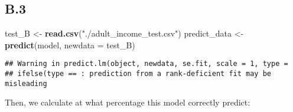 \documentclass[]{article}
\newenvironment{Shaded}{\begin{snugshade}}{\end{snugshade}}
\newcommand{\KeywordTok}[1]{\textcolor[rgb]{0.13,0.29,0.53}{\textbf{#1}}}
\newcommand{\DataTypeTok}[1]{\textcolor[rgb]{0.13,0.29,0.53}{#1}}
\newcommand{\DecValTok}[1]{\textcolor[rgb]{0.00,0.00,0.81}{#1}}
\newcommand{\StringTok}[1]{\textcolor[rgb]{0.31,0.60,0.02}{#1}}
\newcommand{\OperatorTok}[1]{\textcolor[rgb]{0.81,0.36,0.00}{\textbf{#1}}}
\newcommand{\NormalTok}[1]{#1}
\begin{document}
\subsection{B.3}\label{b.3}

\begin{Shaded}
\begin{Highlighting}[]
\NormalTok{test_B <-}\StringTok{ }\KeywordTok{read.csv}\NormalTok{(}\StringTok{"./adult_income_test.csv"}\NormalTok{)}
\NormalTok{predict_data <-}\StringTok{ }\KeywordTok{predict}\NormalTok{(model, }\DataTypeTok{newdata =}\NormalTok{ test_B)}
\end{Highlighting}
\end{Shaded}

\begin{verbatim}
## Warning in predict.lm(object, newdata, se.fit, scale = 1, type =
## ifelse(type == : prediction from a rank-deficient fit may be misleading
\end{verbatim}

\begin{Shaded}
\end{Shaded}

Then, we calculate at what percentage this model correctly predict:

\begin{Shaded}
\end{Shaded}
\end{document}

